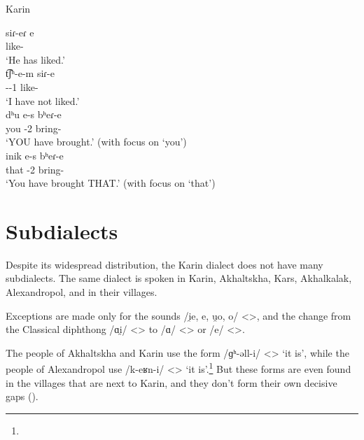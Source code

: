 \begin{exe}
	\ex Karin \label{sent:Karin:morpho:verb:pastPart}
	\begin{xlist}
		\ex \gll siɾ-eɾ e \\
		like-{\perfcvb} {\aux} \\
		\trans `He has liked.'\\
		\ex \gll t͡ʃʰ-e-m siɾ-e \\
		{\neggloss}-{\aux}-1{\sg} like-{\perfcvb} \\
		\trans `I have not liked.'\\
		\ex \gll dʰu e-s bʰeɾ-e \\
		you {\aux}-2{\sg} bring-{\perfcvb} \\
		\trans `YOU have brought.' (with focus on `you')\\
		\ex \gll inik e-s bʰeɾ-e \\
		that {\aux}-2{\sg} bring-{\perfcvb} \\
		\trans `You have brought THAT.' (with focus on `that')\\
	\end{xlist}
\end{exe}

\section{Subdialects}

Despite its widespread distribution, the Karin dialect does not have many subdialects. The same dialect is spoken in Karin, Akhaltskha, Kars, Akhalkalak, Alexandropol, and in their villages. 

Exceptions are made only for the sounds /i̯e, e, u̯o, o/ <>, and the change from the Classical diphthong /ɑi̯/ <> to /ɑ/ <> or /e/ <>. 

The people of Akhaltskha and Karin use the form /ɡʰ-əll-i/ <> `it is', while the people of Alexandropol use /k-eʁn-i/ <> `it is'.\footnote{} But these forms are even found in the villages that are next to Karin, and they don't form their own decisive gaps (). 


